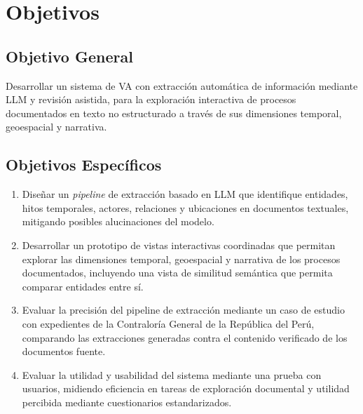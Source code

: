 \section{Objetivos}

\subsection{Objetivo General}

Desarrollar un sistema de \acl{VA} con extracción automática de 
información mediante \acs{LLM} y revisión asistida, para la 
exploración interactiva de procesos documentados en texto 
no estructurado a través de sus dimensiones temporal, 
geoespacial y narrativa.

\subsection{Objetivos Específicos}

\begin{enumerate}
    \item Diseñar un \textit{pipeline} de extracción basado en \acs{LLM} 
     que identifique entidades, hitos temporales, actores, 
     relaciones y ubicaciones en documentos textuales, 
     mitigando posibles alucinaciones del modelo.

     \item Desarrollar un prototipo de vistas interactivas 
     coordinadas que permitan explorar las dimensiones 
     temporal, geoespacial y narrativa de los procesos 
     documentados, incluyendo una vista de similitud 
     semántica que permita comparar entidades entre sí.
     
     
     \item Evaluar la precisión del pipeline de extracción 
     mediante un caso de estudio con expedientes de la 
     Contraloría General de la República del Perú, 
     comparando las extracciones generadas contra el 
     contenido verificado de los documentos fuente.
     
     \item Evaluar la utilidad y usabilidad del sistema 
     mediante una prueba con usuarios, midiendo eficiencia 
     en tareas de exploración documental y utilidad 
     percibida mediante cuestionarios estandarizados.
\end{enumerate}


